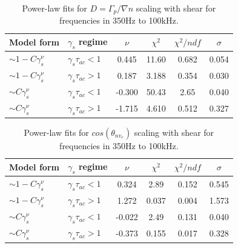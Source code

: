 \documentclass[aip,pop,amsmath,amssymb,preprint,superscriptaddress]{revtex4-1} %
\begin{document}
\begin{table}
\caption{\label{tab:table4}Power-law fits for $D = \Gamma_{p}/\nabla{n}$ scaling with shear for frequencies in 350Hz to 100kHz.}
\begin{ruledtabular}
\begin{tabular}{llcccc}
Model form&$\gamma_{s}$ regime&$\nu$&$\chi^2$&$\chi^2/ndf$&$\sigma$\\
\hline
$\sim 1-C\gamma_{s}^\nu$&$\gamma_{s}\tau_{ac}<1$ &0.445   &11.60    &0.682  &0.054\\
$\sim 1-C\gamma_{s}^\nu$&$\gamma_{s}\tau_{ac}>1$ &0.187   &3.188    &0.354  &0.030\\
$\sim C\gamma_{s}^\nu$&$\gamma_{s}\tau_{ac}<1$   &-0.300  &50.43    &2.65   &0.040\\
$\sim C\gamma_{s}^\nu$&$\gamma_{s}\tau_{ac}>1$   &-1.715  &4.610    &0.512  &0.327\\
\end{tabular}
\end{ruledtabular}
\end{table}

\begin{table}
\caption{\label{tab:table5}Power-law fits for $cos(\theta_{nv_{r}})$ scaling with shear for frequencies in 350Hz to 100kHz.}
\begin{ruledtabular}
\begin{tabular}{llcccc}
Model form&$\gamma_{s}$ regime&$\nu$&$\chi^2$&$\chi^2/ndf$&$\sigma$\\
\hline
$\sim 1-C\gamma_{s}^\nu$&$\gamma_{s}\tau_{ac}<1$ &0.324   &2.89     &0.152  &0.545\\
$\sim 1-C\gamma_{s}^\nu$&$\gamma_{s}\tau_{ac}>1$ &1.272   &0.037    &0.004  &1.573\\
$\sim C\gamma_{s}^\nu$&$\gamma_{s}\tau_{ac}<1$   &-0.022  &2.49     &0.131  &0.040\\
$\sim C\gamma_{s}^\nu$&$\gamma_{s}\tau_{ac}>1$   &-0.373  &0.155    &0.017  &0.328\\
\end{tabular}
\end{ruledtabular}
\end{table}
\end{document}
